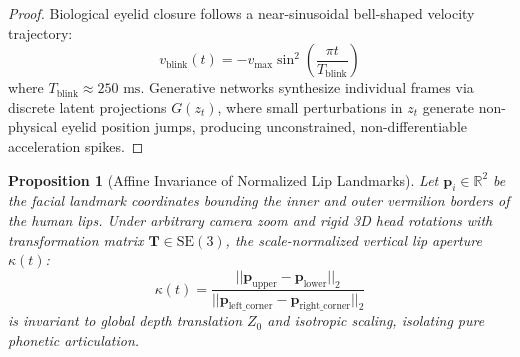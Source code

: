 \documentclass[journal]{IEEEtran}
\newtheorem{proposition}{Proposition}
\begin{document}
\begin{proof}
Biological eyelid closure follows a near-sinusoidal bell-shaped velocity trajectory:
\begin{equation}
v_{\text{blink}}(t) = -v_{\max} \sin^2\left(\frac{\pi t}{T_{\text{blink}}}\right)
\end{equation}
where $T_{\text{blink}} \approx 250\text{ ms}$. Generative networks synthesize individual frames via discrete latent projections $G(z_t)$, where small perturbations in $z_t$ generate non-physical eyelid position jumps, producing unconstrained, non-differentiable acceleration spikes.
\end{proof}

\begin{proposition}[Affine Invariance of Normalized Lip Landmarks]
Let $\mathbf{p}_i \in \mathbb{R}^2$ be the facial landmark coordinates bounding the inner and outer vermilion borders of the human lips. Under arbitrary camera zoom and rigid 3D head rotations with transformation matrix $\mathbf{T} \in \text{SE}(3)$, the scale-normalized vertical lip aperture $\kappa(t)$:
\begin{equation}
\kappa(t) = \frac{||\mathbf{p}_{\text{upper}} - \mathbf{p}_{\text{lower}}||_2}{||\mathbf{p}_{\text{left\_corner}} - \mathbf{p}_{\text{right\_corner}}||_2}
\end{equation}
is invariant to global depth translation $Z_0$ and isotropic scaling, isolating pure phonetic articulation.
\end{proposition}
\end{document}
